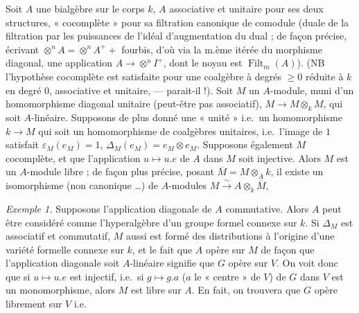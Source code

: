 \documentclass[11pt,a4paper]{article}
\begin{document}

Soit $A$ une bialgèbre sur le corps $k$, $A$ associative et unitaire pour ses
deux structures, « cocomplète » pour sa filtration canonique de comodule (duale
de la filtration par les puissances de l'idéal d'augmentation du dual ; de façon
précise, écrivant $\otimes^{n} A = \otimes^{n} A^{+} + $ fourbis, d'où via la
m.ème itérée du morphisme diagonal, une application
$A \to \otimes^{n} I^{+}$, dont le noyau est
$\operatorname{Filt}_{m}(A)$). (NB
l'hypothèse cocomplète est satisfaite pour une coalgèbre à degrés $\geq 0$
 réduite à $k$ en degré $0$, associative et unitaire, ---
parait-il !). Soit $M$ un $A$-module, muni d'un homomorphisme diagonal unitaire
 (peut-être pas associatif), $M \to M \otimes_{k} M$, qui soit
$A$-linéaire. Supposons de
plus donné une « unité » i.e.\ un homomorphisme $k \to M$ qui soit un
homomorphisme de coalgèbres unitaires, i.e.\ l'image  de $1$
satisfait $\varepsilon_{M}(e_{M}) = 1$,
$\Delta_{M}(e_{M}) = e_{M} \otimes e_{M}$. Supposons également $M$ cocomplète,
et que l'application $u \mapsto u.e$ de $A$ dans $M$ soit injective. Alors $M$
est un $A$-module libre ; de façon plus précise, posant
$\overline{M} = M \otimes_{A} k$, il existe un isomorphisme (non canonique
…) de $A$-modules $M \xrightarrow{\sim} A \otimes_{k} \overline{M}$,



\emph{Exemple 1.} Supposons l'application diagonale de $A$ commutative. Alors
$A$ peut être considéré comme l'hyperalgèbre d'un groupe formel connexe
 sur $k$. Si $\Delta_{M}$ est associatif et commutatif, $M$ aussi est
formé des distributions à l'origine d'une variété formelle connexe  sur
$k$, et le fait que $A$ opère sur $M$ de façon que l'application diagonale soit
$A$-linéaire signifie que $G$ opère sur $V$. On voit donc que si
$u \mapsto u.e$  est injectif, i.e.\ si $g \mapsto g.a$
($a$ le « centre » de $V$) de $G$ dans $V$ est un monomorphisme, alors $M$ est
libre sur $A$. En fait, on trouvera que $G$ opère librement sur $V$ i.e.
\end{document}
